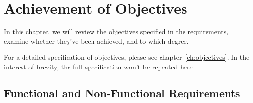 \chapter{Achievement of Objectives}\label{ch:achievement-of-objectives}
In this chapter, we will review the objectives specified in the requirements,
examine whether they've been achieved, and to which degree.

For a detailed specification of objectives, please see chapter~\ref{ch:objectives}.
In the interest of brevity, the full specification won't be repeated here.

\section{Functional and Non-Functional Requirements}\label{sec:functional-and-non-functional-requirements}

